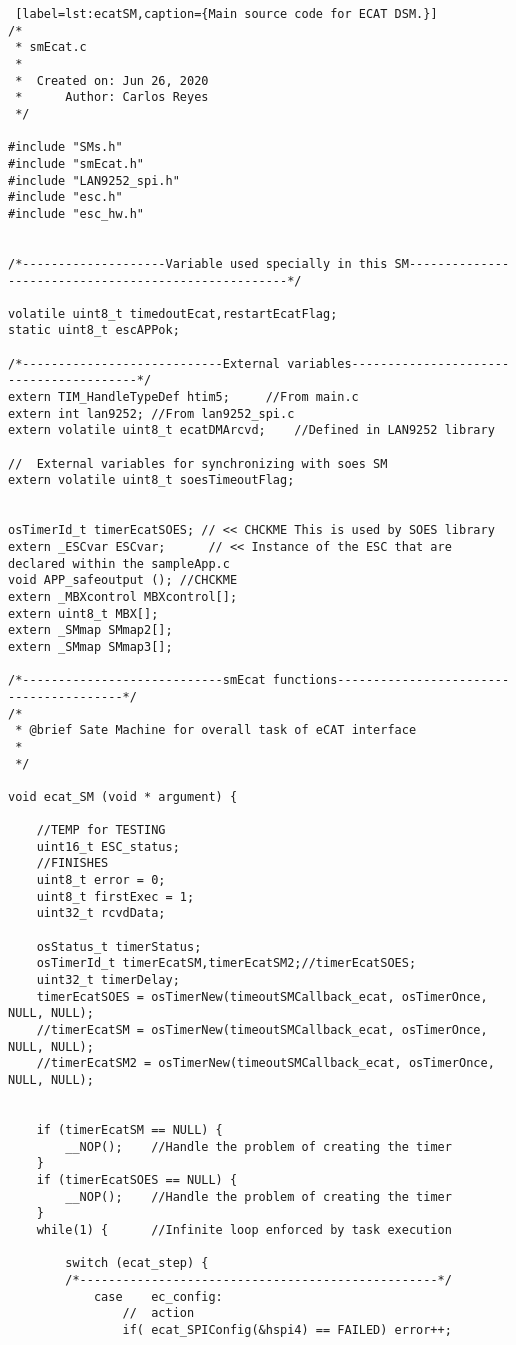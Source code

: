 \begin{lstlisting} [label=lst:ecatSM,caption={Main source code for ECAT DSM.}]
/*
 * smEcat.c
 *
 *  Created on: Jun 26, 2020
 *      Author: Carlos Reyes
 */

#include "SMs.h"
#include "smEcat.h"
#include "LAN9252_spi.h"
#include "esc.h"
#include "esc_hw.h"


/*--------------------Variable used specially in this SM-----------------------------------------------------*/

volatile uint8_t timedoutEcat,restartEcatFlag;	
static uint8_t escAPPok;

/*----------------------------External variables----------------------------------------*/
extern TIM_HandleTypeDef htim5;		//From main.c
extern int lan9252; //From lan9252_spi.c
extern volatile uint8_t ecatDMArcvd;	//Defined in LAN9252 library

//	External variables for synchronizing with soes SM
extern volatile uint8_t soesTimeoutFlag;


osTimerId_t timerEcatSOES; // << CHCKME This is used by SOES library
extern _ESCvar ESCvar;		// << Instance of the ESC that are declared within the sampleApp.c
void APP_safeoutput ();	//CHCKME
extern _MBXcontrol MBXcontrol[];
extern uint8_t MBX[];
extern _SMmap SMmap2[];
extern _SMmap SMmap3[];

/*----------------------------smEcat functions----------------------------------------*/
/*
 * @brief Sate Machine for overall task of eCAT interface
 *
 */

void ecat_SM (void * argument) {

	//TEMP for TESTING
	uint16_t ESC_status;
	//FINISHES
	uint8_t error = 0;
	uint8_t firstExec = 1;
	uint32_t rcvdData;

	osStatus_t timerStatus;
	osTimerId_t timerEcatSM,timerEcatSM2;//timerEcatSOES;
	uint32_t timerDelay;
	timerEcatSOES = osTimerNew(timeoutSMCallback_ecat, osTimerOnce, NULL, NULL);
	//timerEcatSM = osTimerNew(timeoutSMCallback_ecat, osTimerOnce, NULL, NULL);
	//timerEcatSM2 = osTimerNew(timeoutSMCallback_ecat, osTimerOnce, NULL, NULL);


	if (timerEcatSM == NULL) {
		__NOP();	//Handle the problem of creating the timer
	}
	if (timerEcatSOES == NULL) {
		__NOP();	//Handle the problem of creating the timer
	}
	while(1) {		//Infinite loop enforced by task execution

		switch (ecat_step) {
		/*--------------------------------------------------*/
			case	ec_config:
				//	action
				if(	ecat_SPIConfig(&hspi4) == FAILED) error++;


\end{lstlisting}
